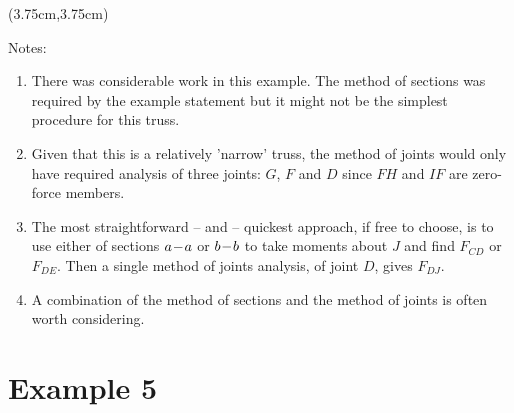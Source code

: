 \documentclass[8pt, xcolor={svgnames, x11names}, professionalfonts]{beamer}
\begin{document}
\begin{frame}{}
{    \begin{textblock*}{8cm}(3.75cm,3.75cm)
      \begin{statsbox}[colback=NavajoWhite3!45]{Notes:}
        \small
        \begin{enumerate}
          \item There was considerable work in this example. The method of sections was required by the example statement but it might not be the simplest procedure for this truss.
          \item Given that this is a relatively 'narrow' truss, the method of joints would only have required analysis of three joints: $G$, $F$ and $D$ since $FH$ and $IF$ are zero-force members.
          \item The most straightforward -- and -- quickest approach, if free to choose, is to use either of sections $a\!-\! a$ or $b\!-\! b$ to take moments about $J$ and find $F_{CD}$ or $F_{DE}$. Then a single method of joints analysis, of joint $D$, gives $F_{DJ}$.
          \item A combination of the method of sections and the method of joints is often worth considering.
         			
        \end{enumerate}
        \par
      \end{statsbox}
    \end{textblock*}
  }  

  \end{frame}

\section{Example 5} %
\end{document}
